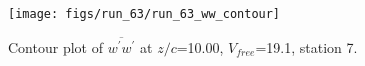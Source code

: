 \begin{figure}[H]
\centering
\texttt{[image: figs/run\_63/run\_63\_ww\_contour]}
\caption{Contour plot of $\overline{w^\prime w^\prime}$ at $z/c$=10.00, $V_{free}$=19.1, station 7.}
\end{figure}


